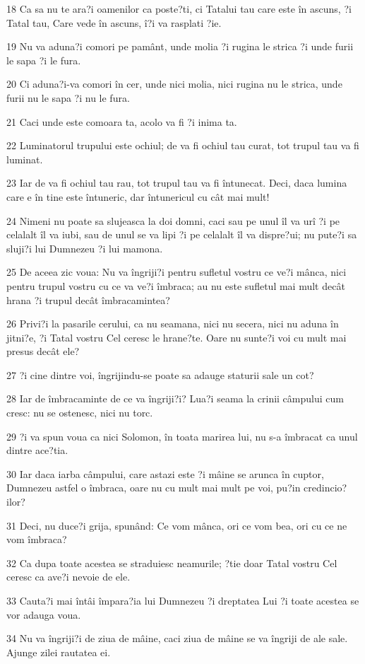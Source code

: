 \par 18 Ca sa nu te ara?i oamenilor ca poste?ti, ci Tatalui tau care este în ascuns, ?i Tatal tau, Care vede în ascuns, î?i va rasplati ?ie.
\par 19 Nu va aduna?i comori pe pamânt, unde molia ?i rugina le strica ?i unde furii le sapa ?i le fura.
\par 20 Ci aduna?i-va comori în cer, unde nici molia, nici rugina nu le strica, unde furii nu le sapa ?i nu le fura.
\par 21 Caci unde este comoara ta, acolo va fi ?i inima ta.
\par 22 Luminatorul trupului este ochiul; de va fi ochiul tau curat, tot trupul tau va fi luminat.
\par 23 Iar de va fi ochiul tau rau, tot trupul tau va fi întunecat. Deci, daca lumina care e în tine este întuneric, dar întunericul cu cât mai mult!
\par 24 Nimeni nu poate sa slujeasca la doi domni, caci sau pe unul îl va urî ?i pe celalalt îl va iubi, sau de unul se va lipi ?i pe celalalt îl va dispre?ui; nu pute?i sa sluji?i lui Dumnezeu ?i lui mamona.
\par 25 De aceea zic voua: Nu va îngriji?i pentru sufletul vostru ce ve?i mânca, nici pentru trupul vostru cu ce va ve?i îmbraca; au nu este sufletul mai mult decât hrana ?i trupul decât îmbracamintea?
\par 26 Privi?i la pasarile cerului, ca nu seamana, nici nu secera, nici nu aduna în jitni?e, ?i Tatal vostru Cel ceresc le hrane?te. Oare nu sunte?i voi cu mult mai presus decât ele?
\par 27 ?i cine dintre voi, îngrijindu-se poate sa adauge staturii sale un cot?
\par 28 Iar de îmbracaminte de ce va îngriji?i? Lua?i seama la crinii câmpului cum cresc: nu se ostenesc, nici nu torc.
\par 29 ?i va spun voua ca nici Solomon, în toata marirea lui, nu s-a îmbracat ca unul dintre ace?tia.
\par 30 Iar daca iarba câmpului, care astazi este ?i mâine se arunca în cuptor, Dumnezeu astfel o îmbraca, oare nu cu mult mai mult pe voi, pu?in credincio?ilor?
\par 31 Deci, nu duce?i grija, spunând: Ce vom mânca, ori ce vom bea, ori cu ce ne vom îmbraca?
\par 32 Ca dupa toate acestea se straduiesc neamurile; ?tie doar Tatal vostru Cel ceresc ca ave?i nevoie de ele.
\par 33 Cauta?i mai întâi împara?ia lui Dumnezeu ?i dreptatea Lui ?i toate acestea se vor adauga voua.
\par 34 Nu va îngriji?i de ziua de mâine, caci ziua de mâine se va îngriji de ale sale. Ajunge zilei rautatea ei.

